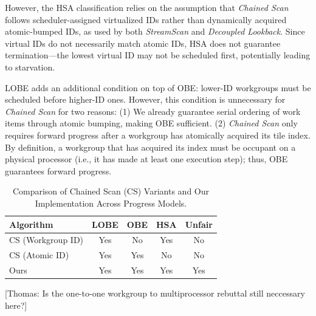 \documentclass[sigconf]{acmart}
\newcommand{\thomas}[1]{{\footnotesize\color{orange}[Thomas: #1]}}
\begin{document}
However, the HSA classification relies on the assumption that \emph{Chained Scan} follows scheduler-assigned virtualized IDs rather than dynamically acquired atomic-bumped IDs, as used by both \emph{StreamScan} and \emph{Decoupled Lookback}. Since virtual IDs do not necessarily match atomic IDs, HSA does not guarantee termination---the lowest virtual ID may not be scheduled first, potentially leading to starvation.

LOBE adds an additional condition on top of OBE: lower-ID workgroups must be scheduled before higher-ID ones. However, this condition is unnecessary for \emph{Chained Scan} for two reasons: (1) We already guarantee serial ordering of work items through atomic bumping, making OBE sufficient. (2) \emph{Chained Scan} only requires forward progress after a workgroup has atomically acquired its tile index. By definition, a workgroup that has acquired its index must be occupant on a physical processor (i.e., it has made at least one execution step); thus, OBE guarantees forward progress.

\begin{table}
  \small
  \centering
  \begin{tabular}{lcccc}
    \toprule
    Algorithm       & LOBE & OBE & HSA & Unfair \\
    \midrule
    CS (Workgroup ID)  & Yes & No  & Yes & No  \\
    CS (Atomic ID)        & Yes & Yes & No  & No  \\
    Ours               & Yes & Yes & Yes & Yes \\
    \bottomrule
  \end{tabular}
  \caption{Comparison of Chained Scan (CS) Variants and Our Implementation Across Progress Models.\label{tab:progress_models}}
\end{table}

\thomas{Is the one-to-one workgroup to multiprocessor rebuttal still neccessary here?}
\end{document}
